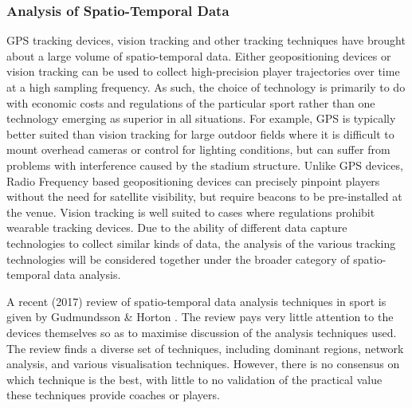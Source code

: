 
\subsubsection{Analysis of Spatio-Temporal Data}\label{analysis-of-spatio-temporal-data}

GPS tracking devices, vision tracking and other tracking techniques have
brought about a large volume of spatio-temporal data. Either geopositioning devices or vision tracking can be used to collect high-precision player trajectories over time at a high sampling frequency.
As such, the choice of technology is primarily to do with economic costs and regulations of the particular sport rather than one technology emerging as superior in all situations.
For example, GPS is typically better suited than vision tracking for large outdoor fields where it is difficult to mount overhead cameras or control for lighting conditions, but can suffer from problems with interference caused by the stadium structure. Unlike GPS devices, Radio Frequency based geopositioning devices can precisely pinpoint players without the need for satellite visibility, but require beacons to be pre-installed at the venue. Vision tracking is well suited to cases where regulations prohibit wearable tracking devices. Due to the ability of different data capture technologies to collect similar kinds of data, the analysis of the various tracking technologies will be considered together under the broader category of spatio-temporal data analysis.

A recent (2017) review of spatio-temporal data analysis techniques in sport is
given by Gudmundsson \& Horton \cite{Gudmundsson2016}. %
The review pays very little attention to the devices
themselves so as to maximise discussion of the analysis techniques used.
The review finds a diverse set of techniques, including dominant regions,
network analysis, and various visualisation techniques. However, there
is no consensus on which technique is the best, with little to no
validation of the practical value these techniques provide coaches or
players.

